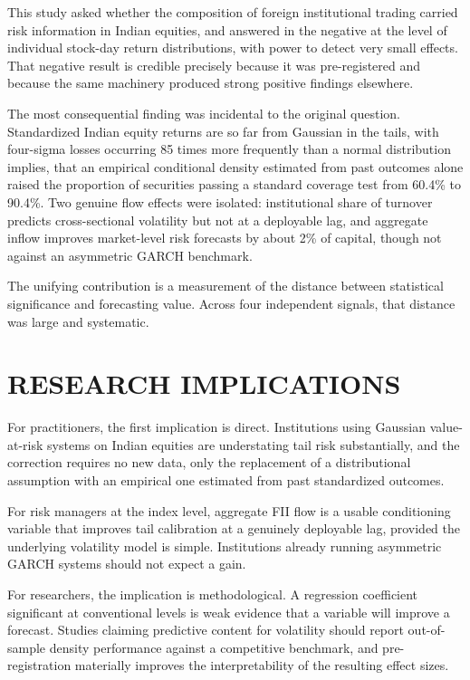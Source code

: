 \documentclass[12pt]{article}
\begin{document}
This study asked whether the composition of foreign institutional trading
carried risk information in Indian equities, and answered in the negative at
the level of individual stock-day return distributions, with power to detect
very small effects. That negative result is credible precisely because it was
pre-registered and because the same machinery produced strong positive
findings elsewhere.

The most consequential finding was incidental to the original question.
Standardized Indian equity returns are so far from Gaussian in the tails, with
four-sigma losses occurring 85 times more frequently than a normal
distribution implies, that an empirical conditional density estimated from
past outcomes alone raised the proportion of securities passing a standard
coverage test from 60.4\% to 90.4\%. Two genuine flow effects were isolated:
institutional share of turnover predicts cross-sectional volatility but not at
a deployable lag, and aggregate inflow improves market-level risk forecasts by
about 2\% of capital, though not against an asymmetric GARCH benchmark.

The unifying contribution is a measurement of the distance between statistical
significance and forecasting value. Across four independent signals, that
distance was large and systematic.

\section*{RESEARCH IMPLICATIONS}

For practitioners, the first implication is direct. Institutions using
Gaussian value-at-risk systems on Indian equities are understating tail risk
substantially, and the correction requires no new data, only the replacement
of a distributional assumption with an empirical one estimated from past
standardized outcomes.

For risk managers at the index level, aggregate FII flow is a usable
conditioning variable that improves tail calibration at a genuinely deployable
lag, provided the underlying volatility model is simple. Institutions already
running asymmetric GARCH systems should not expect a gain.

For researchers, the implication is methodological. A regression coefficient
significant at conventional levels is weak evidence that a variable will
improve a forecast. Studies claiming predictive content for volatility should
report out-of-sample density performance against a competitive benchmark, and
pre-registration materially improves the interpretability of the resulting
effect sizes.
\end{document}
